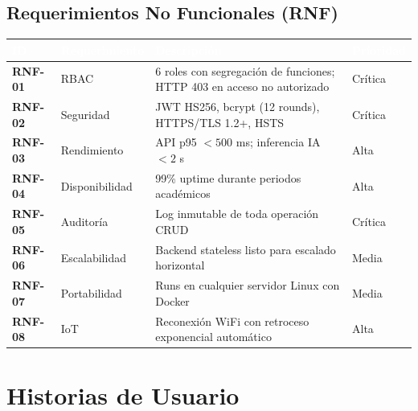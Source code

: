 \documentclass[12pt,a4paper,twoside]{report}
\begin{document}
\section{Requerimientos No Funcionales (RNF)}

\begin{center}
\begin{tabularx}{\textwidth}{|>{\bfseries}p{2cm}|p{3cm}|X|p{1.8cm}|}
\hline
\rowcolor{tableHdr}
\textcolor{white}{\textbf{ID}} &
\textcolor{white}{\textbf{Requerimiento}} &
\textcolor{white}{\textbf{Descripción}} &
\textcolor{white}{\textbf{Prioridad}} \\
\hline
\rowcolor{rowOdd}RNF-01 & RBAC & 6 roles con segregación de funciones; HTTP 403 en acceso no autorizado & Crítica \\
\hline\rowcolor{rowEven}RNF-02 & Seguridad & JWT HS256, bcrypt (12 rounds), HTTPS/TLS 1.2+, HSTS & Crítica \\
\hline\rowcolor{rowOdd}RNF-03 & Rendimiento & API p95 $< 500$ ms; inferencia IA $< 2$ s & Alta \\
\hline\rowcolor{rowEven}RNF-04 & Disponibilidad & 99\% uptime durante periodos académicos & Alta \\
\hline\rowcolor{rowOdd}RNF-05 & Auditoría & Log inmutable de toda operación CRUD & Crítica \\
\hline\rowcolor{rowEven}RNF-06 & Escalabilidad & Backend stateless listo para escalado horizontal & Media \\
\hline\rowcolor{rowOdd}RNF-07 & Portabilidad & Runs en cualquier servidor Linux con Docker & Media \\
\hline\rowcolor{rowEven}RNF-08 & IoT & Reconexión WiFi con retroceso exponencial automático & Alta \\
\hline
\end{tabularx}
\end{center}

\chapter{Historias de Usuario}
\end{document}
